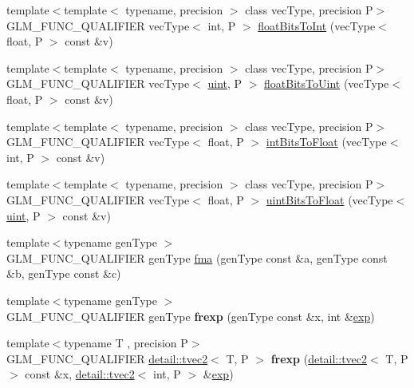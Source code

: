\begin{DoxyCompactItemize}
\item 
{\footnotesize template$<$template$<$ typename, precision $>$ class vec\+Type, precision P$>$ }\\G\+L\+M\+\_\+\+F\+U\+N\+C\+\_\+\+Q\+U\+A\+L\+I\+F\+I\+ER vec\+Type$<$ int, P $>$ \hyperlink{group__core__func__common_gac4a0710238ae54c67931dd29a0b0f873}{float\+Bits\+To\+Int} (vec\+Type$<$ float, P $>$ const \&v)
\item 
{\footnotesize template$<$template$<$ typename, precision $>$ class vec\+Type, precision P$>$ }\\G\+L\+M\+\_\+\+F\+U\+N\+C\+\_\+\+Q\+U\+A\+L\+I\+F\+I\+ER vec\+Type$<$ \hyperlink{group__core__precision_ga4fd29415871152bfb5abd588334147c8}{uint}, P $>$ \hyperlink{group__core__func__common_ga1804d4c443605d8a27be644aa461afe4}{float\+Bits\+To\+Uint} (vec\+Type$<$ float, P $>$ const \&v)
\item 
{\footnotesize template$<$template$<$ typename, precision $>$ class vec\+Type, precision P$>$ }\\G\+L\+M\+\_\+\+F\+U\+N\+C\+\_\+\+Q\+U\+A\+L\+I\+F\+I\+ER vec\+Type$<$ float, P $>$ \hyperlink{group__core__func__common_gad21ab176dd0e6b59d923db5efca87f4e}{int\+Bits\+To\+Float} (vec\+Type$<$ int, P $>$ const \&v)
\item 
{\footnotesize template$<$template$<$ typename, precision $>$ class vec\+Type, precision P$>$ }\\G\+L\+M\+\_\+\+F\+U\+N\+C\+\_\+\+Q\+U\+A\+L\+I\+F\+I\+ER vec\+Type$<$ float, P $>$ \hyperlink{group__core__func__common_ga3acab37650ecd792dc84548094b58684}{uint\+Bits\+To\+Float} (vec\+Type$<$ \hyperlink{group__core__precision_ga4fd29415871152bfb5abd588334147c8}{uint}, P $>$ const \&v)
\item 
{\footnotesize template$<$typename gen\+Type $>$ }\\G\+L\+M\+\_\+\+F\+U\+N\+C\+\_\+\+Q\+U\+A\+L\+I\+F\+I\+ER gen\+Type \hyperlink{group__core__func__common_gad0f444d4b81cc53c3b6edf5aa25078c2}{fma} (gen\+Type const \&a, gen\+Type const \&b, gen\+Type const \&c)
\item 
{\footnotesize template$<$typename gen\+Type $>$ }\\G\+L\+M\+\_\+\+F\+U\+N\+C\+\_\+\+Q\+U\+A\+L\+I\+F\+I\+ER gen\+Type {\bfseries frexp} (gen\+Type const \&x, int \&\hyperlink{group__core__func__exponential_gae154699ba6bda068d4b87cf9b987381f}{exp})\hypertarget{namespaceglm_a3fab9fc606511c1751ff2173afccaa6e}{}\label{namespaceglm_a3fab9fc606511c1751ff2173afccaa6e}

\item 
{\footnotesize template$<$typename T , precision P$>$ }\\G\+L\+M\+\_\+\+F\+U\+N\+C\+\_\+\+Q\+U\+A\+L\+I\+F\+I\+ER \hyperlink{structglm_1_1detail_1_1tvec2}{detail\+::tvec2}$<$ T, P $>$ {\bfseries frexp} (\hyperlink{structglm_1_1detail_1_1tvec2}{detail\+::tvec2}$<$ T, P $>$ const \&x, \hyperlink{structglm_1_1detail_1_1tvec2}{detail\+::tvec2}$<$ int, P $>$ \&\hyperlink{group__core__func__exponential_gae154699ba6bda068d4b87cf9b987381f}{exp})\hypertarget{namespaceglm_a555adf9521601a3823c9d573333c1360}{}\label{namespaceglm_a555adf9521601a3823c9d573333c1360}


\end{DoxyCompactItemize}
